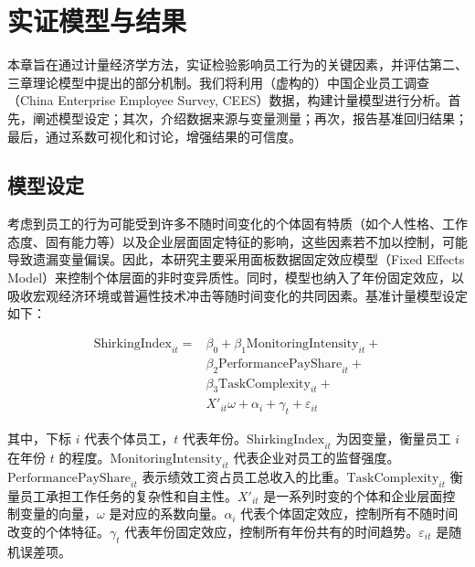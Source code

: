 \chapter{实证模型与结果}
\label{chap:empirical} %

本章旨在通过计量经济学方法，实证检验影响员工行为的关键因素，并评估第二、三章理论模型中提出的部分机制。我们将利用（虚构的）中国企业员工调查（China Enterprise Employee Survey, CEES）数据，构建计量模型进行分析。首先，阐述模型设定；其次，介绍数据来源与变量测量；再次，报告基准回归结果；最后，通过系数可视化和讨论，增强结果的可信度。

\section{模型设定}

考虑到员工的行为可能受到许多不随时间变化的个体固有特质（如个人性格、工作态度、固有能力等）以及企业层面固定特征的影响，这些因素若不加以控制，可能导致遗漏变量偏误。因此，本研究主要采用面板数据固定效应模型（Fixed Effects Model）来控制个体层面的非时变异质性。同时，模型也纳入了年份固定效应，以吸收宏观经济环境或普遍性技术冲击等随时间变化的共同因素。基准计量模型设定如下：

\begin{equation}
\label{eq:empirical_model}
\begin{aligned}
\text{ShirkingIndex}_{it} = & \beta_0 + \beta_1 \text{MonitoringIntensity}_{it} + \\
                            & \beta_2 \text{PerformancePayShare}_{it} + \\
                            & \beta_3 \text{TaskComplexity}_{it} + \\
                            & X'_{it} \omega + \alpha_i + \gamma_t + \varepsilon_{it}
\end{aligned}
\end{equation}

\noindent
其中，下标 \(i\) 代表个体员工，\(t\) 代表年份。\(\text{ShirkingIndex}_{it}\) 为因变量，衡量员工 \(i\) 在年份 \(t\) 的程度。\(\text{MonitoringIntensity}_{it}\) 代表企业对员工的监督强度。\(\text{PerformancePayShare}_{it}\) 表示绩效工资占员工总收入的比重。\(\text{TaskComplexity}_{it}\) 衡量员工承担工作任务的复杂性和自主性。\(X'_{it}\) 是一系列时变的个体和企业层面控制变量的向量，\(\omega\) 是对应的系数向量。\(\alpha_i\) 代表个体固定效应，控制所有不随时间改变的个体特征。\(\gamma_t\) 代表年份固定效应，控制所有年份共有的时间趋势。\(\varepsilon_{it}\) 是随机误差项。

